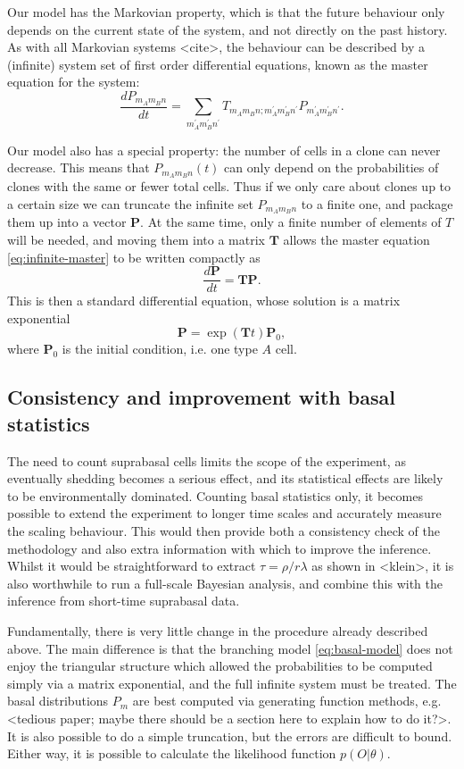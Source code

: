 \documentclass[10pt,UKenglish]{article}
\begin{document}
Our model has the Markovian property, which is that the future behaviour only
depends on the current state of the system, and not directly on the past
history. As with all Markovian systems <cite>, the behaviour can be described by
a (infinite) system set of first order differential equations, known as the
master equation for the system: 
\begin{equation}
\frac{dP_{m_A m_B n}}{dt} = \sum_{m_A^\prime m_B^\prime n^\prime} T_{m_A m_B n; m_A^\prime m_B^\prime n^\prime} P_{m_A^\prime m_B^\prime n^\prime}. \label{eq:infinite-master}
\end{equation}

Our model also has a special property: the number of cells in a clone can never
decrease. This means that $P_{m_A m_B n}(t)$ can only depend on the
probabilities of clones with the same or fewer total cells. Thus if we only care
about clones up to a certain size we can truncate the infinite set $P_{m_A m_B
n}$ to a finite one, and package them up into a vector $\mathbf P$. At the same
time, only a finite number of elements of $T$ will be needed, and moving them
into a matrix $\mathbf T$ allows the master equation \eqref{eq:infinite-master}
to be written compactly as $$\frac{d\mathbf P}{dt} = \mathbf{T P}.$$ This is
then a standard differential equation, whose solution is a matrix exponential
$$\mathbf P = \exp(\mathbf T t) \mathbf P_0,$$ where $\mathbf P_0$ is the
initial condition, i.e. one type $A$ cell.

\subsection{\label{sec:ball-plane}Consistency and improvement with basal statistics}

The need to count suprabasal cells limits the scope of the experiment, as
eventually shedding becomes a serious effect, and its statistical effects are
likely to be environmentally dominated. Counting basal statistics only, it
becomes possible to extend the experiment to longer time scales and accurately
measure the scaling behaviour. This would then provide both a consistency check
of the methodology and also extra information with which to improve the
inference. Whilst it would be straightforward to extract $\tau = \rho/r\lambda$
as shown in <klein>, it is also worthwhile to run a full-scale Bayesian
analysis, and combine this with the inference from short-time suprabasal data.

Fundamentally, there is very little change in the procedure already described
above. The main difference is that the branching model \ref{eq:basal-model} does
not enjoy the triangular structure which allowed the probabilities to be
computed simply via a matrix exponential, and the full infinite system must be
treated. The basal distributions $P_m$ are best computed via generating function
methods, e.g. <tedious paper; maybe there should be a section here to explain
how to do it?>. It is also possible to do a simple truncation, but the errors
are difficult to bound. Either way, it is possible to calculate the likelihood
function $p(O|\theta)$.
\end{document}
